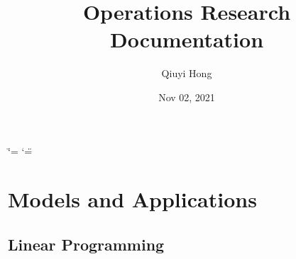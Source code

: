 \documentclass[letterpaper,10pt,english]{sphinxmanual}
\title{Operations Research Documentation}
\date{Nov 02, 2021}
\author{Qiuyi Hong}
\begin{document}
\ifdefined\shorthandoff
  \ifnum\catcode`\=\string=\active\shorthandoff{=}\fi
  \ifnum\catcode`\"=\active{}\fi
\fi

\pagestyle{empty}
\sphinxmaketitle
\pagestyle{plain}
\sphinxtableofcontents
\pagestyle{normal}
\label{\detokenize{index::doc}}



\chapter{Models and Applications}
\label{\detokenize{operationsResearch/modelsAndApplications:models-and-applications}}\label{\detokenize{operationsResearch/modelsAndApplications::doc}}

\section{Linear Programming}
\label{\detokenize{operationsResearch/modelsAndApplications:linear-programming}}
\end{document}
